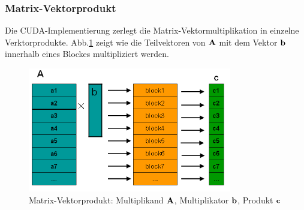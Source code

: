 

\subsubsection{Matrix-Vektorprodukt}

Die CUDA-Implementierung zerlegt die Matrix-Vektormultiplikation in einzelne
Verktorprodukte.
Abb.\ref{MatrixVektor} zeigt wie die Teilvektoren von $ \bf A$ mit dem Vektor $ \bf b$
innerhalb eines Blockes multipliziert werden.


\begin{figure}[htbp]
\includegraphics[width=3.5in]{../xby/pic//MatrixVektor}
\caption{ \label{MatrixVektor} Matrix-Vektorprodukt: Multiplikand $\bf A$, Multiplikator $ \bf b$, Produkt $\bf c$ }

\end{figure}
